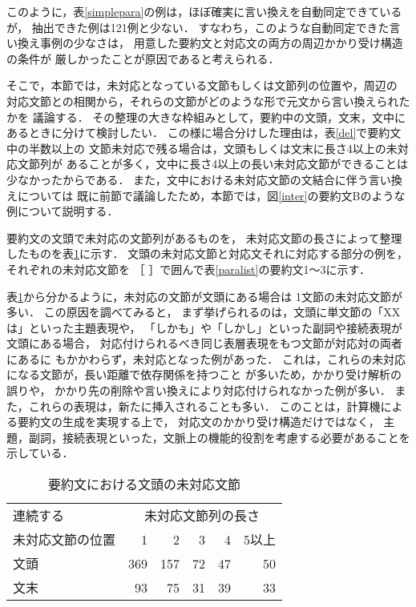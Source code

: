 このように，表\ref{simplepara}の例は，ほぼ確実に言い換えを自動同定できているが，
抽出できた例は121例と少ない．
すなわち，このような自動同定できた言い換え事例の少なさは，
用意した要約文と対応文の両方の周辺かかり受け構造の条件が
厳しかったことが原因であると考えられる．


そこで，本節では，未対応となっている文節もしくは文節列の位置や，周辺の
対応文節との相関から，それらの文節がどのような形で元文から言い換えられたかを
議論する．
その整理の大きな枠組みとして，要約中の文頭，文末，文中にあるときに分けて検討したい．
この様に場合分けした理由は，表\ref{del}で要約文中の半数以上の
文節未対応で残る場合は，文頭もしくは文末に長さ4以上の未対応文節列が
あることが多く，文中に長さ4以上の長い未対応文節ができることは
少なかったからである．
また，文中における未対応文節の文結合に伴う言い換えについては
既に前節で議論したため，本節では，図\ref{inter}の要約文Bのような
例について説明する．\\


要約文の文頭で未対応の文節列があるものを，
未対応文節の長さによって整理したものを表\ref{headcorres}に示す．
文頭の未対応文節と対応文それに対応する部分の例を，それぞれの未対応文節を
［ ］で囲んで表\ref{paralist}の要約文1〜3に示す．

表\ref{headcorres}から分かるように，未対応の文節が文頭にある場合は
1文節の未対応文節が多い．
この原因を調べてみると，
まず挙げられるのは，文頭に単文節の「XXは」といった主題表現や，
「しかも」や「しかし」といった副詞や接続表現が文頭にある場合，
対応付けられるべき同じ表層表現をもつ文節が対応対の両者にあるに
もかかわらず，未対応となった例があった．
これは，これらの未対応になる文節が，長い距離で依存関係を持つこと
が多いため，かかり受け解析の誤りや，
かかり先の削除や言い換えにより対応付けられなかった例が多い．
また，これらの表現は，新たに挿入されることも多い．
このことは，計算機による要約文の生成を実現する上で，
対応文のかかり受け構造だけではなく，
主題，副詞，接続表現といった，文脈上の機能的役割を考慮する必要があることを示している．

\begin{table}
\caption{要約文における文頭の未対応文節} 
\label{headcorres}
\begin{center}
\begin{tabular}{|l|r|r|r|r|r|}
\hline
連続する& \multicolumn{5}{|c|}{未対応文節列の長さ}     \\ \cline{2-6}
未対応文節の位置  & 1 & 2 & 3  & 4 & 5以上\\ \hline \hline
文頭　&369 &157 &72 & 47 & 50\\
文末 &93 & 75 & 31& 39& 33\\ \hline
\end{tabular}
\end{center}
\end{table}


